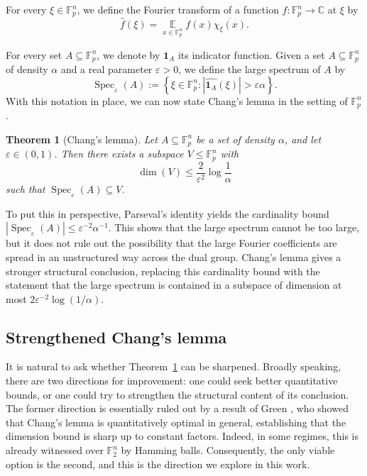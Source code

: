 \documentclass[11pt,reqno]{amsart}
\theoremstyle{plain}
\newtheorem{thm}{Theorem}[section]
\theoremstyle{remark}
\begin{document}
For every $\xi\in\mathbb{F}_p^n$, we define the Fourier transform of a function $f:\mathbb{F}_p^n\to\mathbb{C}$ at $\xi$ by
$$
\widehat{f}(\xi)=\mathop{\mathbb E}\limits_{x\in\mathbb{F}_p^n} f(x)\overline{\chi_\xi(x)}.
$$

For every set $A\subseteq \mathbb{F}_p^n$, we denote by $\mathbf{1}_A$ its indicator function.
Given a set $A\subseteq \mathbb{F}_p^n$ of density $\alpha$ and a real parameter $\varepsilon>0$, we define the large spectrum of $A$ by
$$
\operatorname{Spec}_\varepsilon(A):=
\left\{
\xi\in \mathbb{F}_p^n:
\left|\widehat{\mathbf{1}_A}(\xi)\right|> \varepsilon\alpha
\right\}.
$$
With this notation in place, we can now state Chang's lemma in the setting of $\mathbb{F}_p^n$.

\begin{thm}[Chang's lemma]\label{theo:Chang-original}
Let $A\subseteq \mathbb{F}_p^n$ be a set of density $\alpha$, and let $\varepsilon\in(0,1)$.
Then there exists a subspace $V\leq \mathbb{F}_p^n$ with
\[
\dim(V)\leq \frac{2}{\varepsilon^2}\log\frac{1}{\alpha}
\]
such that $\operatorname{Spec}_\varepsilon(A)\subseteq V$.
\end{thm}
To put this in perspective, Parseval's identity yields the cardinality bound
$
|\operatorname{Spec}_\varepsilon(A)| \le \varepsilon^{-2}\alpha^{-1}.
$
This shows that the large spectrum cannot be too large, but it does not rule out the possibility that the large Fourier
coefficients are spread in an unstructured way across the dual group. Chang's
lemma gives a stronger structural conclusion, replacing this cardinality bound with the
statement that the large spectrum is contained in a subspace of dimension at
most $2\varepsilon^{-2}\log(1/\alpha)$.

\subsection{Strengthened Chang's lemma}
It is natural to ask whether Theorem~\ref{theo:Chang-original} can be sharpened. Broadly speaking, there are two directions for improvement: one could seek better quantitative bounds, or one could try to strengthen the structural content of its conclusion. The former direction is essentially ruled out by a result of Green \cite{Green2003}, who showed that Chang’s lemma is quantitatively optimal in general, establishing that the dimension bound is sharp up to constant factors. Indeed, in some regimes, this is already witnessed over $\mathbb{F}_2^n$ by Hamming balls. Consequently, the only viable option is the second, and this is the direction we explore in this work. 
\end{document}
